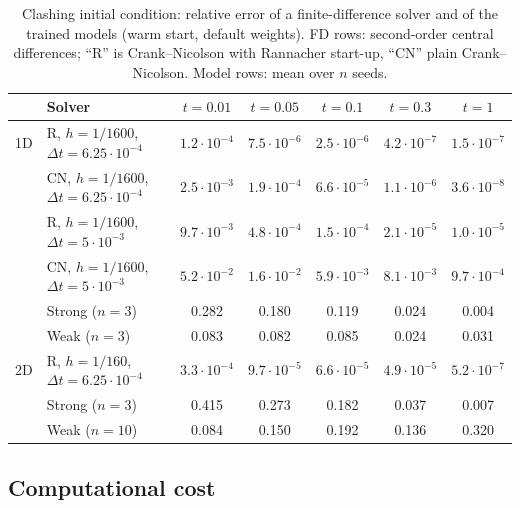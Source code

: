 \documentclass[a4paper,fleqn]{cas-sc}
\begin{document}
\begin{table}[htbp]
\centering
\caption{Clashing initial condition: relative error of a finite-difference solver and of the trained models (warm start,
default weights). FD rows: second-order central differences; ``R'' is Crank--Nicolson with Rannacher start-up, ``CN''
plain Crank--Nicolson. Model rows: mean over $n$ seeds.}
\label{tab:cn}
\footnotesize
\setlength{\tabcolsep}{2.5pt}
\begin{tabular}{llccccc}
\toprule
 & Solver & $t=0.01$ & $t=0.05$ & $t=0.1$ & $t=0.3$ & $t=1$ \\
\midrule
1D & R, $h=1/1600$, $\Delta t=6.25{\cdot}10^{-4}$ & $1.2{\cdot}10^{-4}$ & $7.5{\cdot}10^{-6}$ & $2.5{\cdot}10^{-6}$ & $4.2{\cdot}10^{-7}$ & $1.5{\cdot}10^{-7}$ \\
 & CN, $h=1/1600$, $\Delta t=6.25{\cdot}10^{-4}$ & $2.5{\cdot}10^{-3}$ & $1.9{\cdot}10^{-4}$ & $6.6{\cdot}10^{-5}$ & $1.1{\cdot}10^{-6}$ & $3.6{\cdot}10^{-8}$ \\
 & R, $h=1/1600$, $\Delta t=5{\cdot}10^{-3}$ & $9.7{\cdot}10^{-3}$ & $4.8{\cdot}10^{-4}$ & $1.5{\cdot}10^{-4}$ & $2.1{\cdot}10^{-5}$ & $1.0{\cdot}10^{-5}$ \\
 & CN, $h=1/1600$, $\Delta t=5{\cdot}10^{-3}$ & $5.2{\cdot}10^{-2}$ & $1.6{\cdot}10^{-2}$ & $5.9{\cdot}10^{-3}$ & $8.1{\cdot}10^{-3}$ & $9.7{\cdot}10^{-4}$ \\
 & Strong ($n=3$) & 0.282 & 0.180 & 0.119 & 0.024 & 0.004 \\
 & Weak ($n=3$) & 0.083 & 0.082 & 0.085 & 0.024 & 0.031 \\
\midrule
2D & R, $h=1/160$, $\Delta t=6.25{\cdot}10^{-4}$ & $3.3{\cdot}10^{-4}$ & $9.7{\cdot}10^{-5}$ & $6.6{\cdot}10^{-5}$ & $4.9{\cdot}10^{-5}$ & $5.2{\cdot}10^{-7}$ \\
 & Strong ($n=3$) & 0.415 & 0.273 & 0.182 & 0.037 & 0.007 \\
 & Weak ($n=10$) & 0.084 & 0.150 & 0.192 & 0.136 & 0.320 \\
\bottomrule
\end{tabular}
\end{table}

\subsection{Computational cost}
\label{sec:cost}
\end{document}
